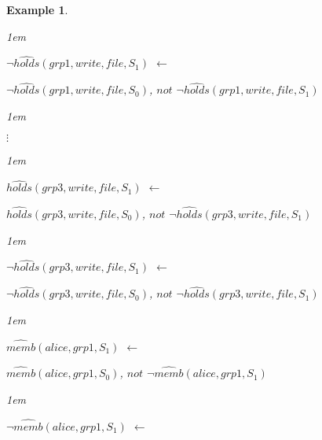\documentclass[11pt]{report}
\newtheorem{vexample}{Example}[chapter]
\newenvironment{vquote}
{
  \begin{list}{}{\leftmargin 1em}\item[]
}
{
  \end{list}
}
\begin{document}
\begin{vexample}
\begin{enumerate}
                \begin{vquote}
                  $\lnot\hat{holds}(grp1, write, file, S_{1})$ $\leftarrow$
                
                  \hspace{1em}
                  $\lnot\hat{holds}(grp1, write, file, S_{0})$,
                  $not$ $\lnot\hat{holds}(grp1, write, file, S_{1})$
                \end{vquote}
                
                \begin{vquote}
                  \hspace{2em}$\vdots$
                \end{vquote}
                
                \begin{vquote}
                  $\hat{holds}(grp3, write, file, S_{1})$ $\leftarrow$
                
                  \hspace{1em}
                  $\hat{holds}(grp3, write, file, S_{0})$,
                  $not$ $\lnot\hat{holds}(grp3, write, file, S_{1})$
                \end{vquote}
                
                \begin{vquote}
                  $\lnot\hat{holds}(grp3, write, file, S_{1})$ $\leftarrow$
                
                  \hspace{1em}
                  $\lnot\hat{holds}(grp3, write, file, S_{0})$,
                  $not$ $\lnot\hat{holds}(grp3, write, file, S_{1})$
                \end{vquote}
                
                \begin{vquote}
                  $\hat{memb}(alice, grp1, S_{1})$ $\leftarrow$
                
                  \hspace{1em}
                  $\hat{memb}(alice, grp1, S_{0})$,
                  $not$ $\lnot\hat{memb}(alice, grp1, S_{1})$
                \end{vquote}

                \begin{vquote}
                  $\lnot \hat{memb}(alice, grp1, S_{1})$ $\leftarrow$
            

\end{vquote}
\end{enumerate}
\end{vexample}
\end{document}
